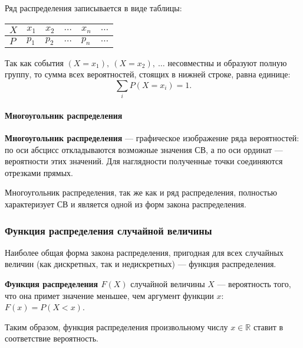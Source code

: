 \documentclass[a4paper]{article}
\newcommand{\key}[1]{{\color{Medium}\bfseries #1}}
\begin{document}
                Ряд распределения записывается в виде таблицы:

                \begin{tabular}{*{6}{|C{1.8cm}}|}
                    \hline
                    $X$ & $x_1$ & $x_2$ & $\ldots$ & $x_n$ & $\ldots$ \\
                    \hline
                    $P$ & $p_1$ & $p_2$ & $\ldots$ & $p_n$ & $\ldots$ \\
                    \hline
                \end{tabular}

                Так как события $(X = x_1) , \: (X = x_2) , \: \ldots$ несовместны и образуют полную группу, то сумма всех вероятностей, стоящих в нижней строке, равна единице:
                \begin{equation*}
                    \sum\limits_{i} P(X = x_i) = 1 .
                \end{equation*}

                \paragraph{Многоугольник распределения}

                    \key{Многоугольник распределения} --- графическое изображение ряда вероятностей: по оси абсцисс откладываются возможные значения СВ, а по оси ординат --- вероятности этих значений. Для наглядности полученные точки соединяются отрезками прямых.
                    
                    Многоугольник распределения, так же как и ряд распределения, полностью характеризует СВ и является одной из форм закона распределения.

            \subsubsection{Функция распределения случайной величины}

                Наиболее общая форма закона распределения, пригодная для всех случайных величин (как дискретных, так и недискретных) --- функция распределения.
                
                \key{Функция распределения \boldmath$F(X)$} случайной величины $X$ --- вероятность того, что она примет значение меньшее, чем аргумент функции $x$: $F(x) = P(X < x)$.

                Таким образом, функция распределения произвольному числу $x \in \mathbb{R}$ ставит в соответствие вероятность.
                
\end{document}
